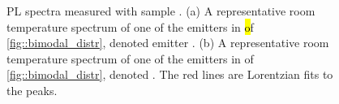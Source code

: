 	\begin{figure}
		\begin{subfigure}[tp]{0.45\linewidth}
			\caption{}\label{subfig::emnarrow}
			\centering
		\end{subfigure}
		\hfill
		\begin{subfigure}[tp]{0.45\linewidth}
			\caption{}\label{subfig::embroad}
			\centering
		\end{subfigure}
		\caption{PL spectra measured with sample \insituHao. (a) A representative room temperature spectrum of one of the emitters in \hl of \autoref{fig::bimodal_distr}, denoted emitter \emnarrow. (b) A representative room temperature spectrum of one of the emitters in \vl of \autoref{fig::bimodal_distr}, denoted \embroad. The red lines are Lorentzian fits to the peaks.}
		\label{fig::spectra}
	\end{figure}

